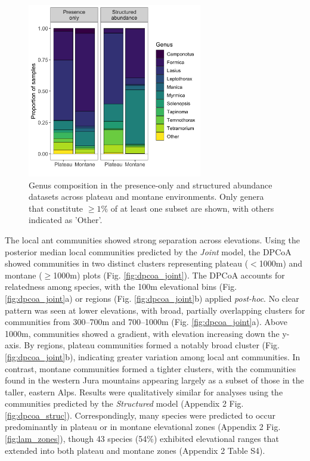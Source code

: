 \documentclass[preprint,review,times,12pt,3p]{elsarticle}
\begin{document}
\begin{figure}
	\centering\includegraphics[width=3in]{ms/1_Ecography/1/figs/genus_assemblages.png}
	\caption{\label{fig:genus_assemblages} Genus composition in the presence-only and structured abundance datasets across plateau and montane environments. Only genera that constitute $\geq 1\%$ of at least one subset are shown, with others indicated as 'Other'.}
\end{figure}

The local ant communities showed strong separation across elevations. Using the posterior median local communities predicted by the \emph{Joint} model, the DPCoA showed communities in two distinct clusters representing plateau ($<$1000m) and montane ($\geq$1000m) plots (Fig. \ref{fig:dpcoa_joint}). The DPCoA accounts for relatedness among species, with the 100m elevational bins (Fig. \ref{fig:dpcoa_joint}a) or regions (Fig. \ref{fig:dpcoa_joint}b) applied \emph{post-hoc}. No clear pattern was seen at lower elevations, with broad, partially overlapping clusters for communities from 300–700m and 700–1000m (Fig. \ref{fig:dpcoa_joint}a). Above 1000m, communities showed a gradient, with elevation increasing down the y-axis. By regions, plateau communities formed a notably broad cluster (Fig. \ref{fig:dpcoa_joint}b), indicating greater variation among local ant communities. In contrast, montane communities formed a tighter clusters, with the communities found in the western Jura mountains appearing largely as a subset of those in the taller, eastern Alps. Results were qualitatively similar for analyses using the communities predicted by the \emph{Structured} model (Appendix 2 Fig. \ref{fig:dpcoa_struc}). Correspondingly, many species were predicted to occur predominantly in plateau or in montane elevational zones (Appendix 2 Fig. \ref{fig:lam_zones}), though 43 species (54\%) exhibited elevational ranges that extended into both plateau and montane zones (Appendix 2 Table S4).
\end{document}
